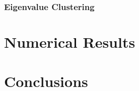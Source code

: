 \documentclass[10pt]{article}
\begin{document}
\begin{multicols}{2}
\subsubsection{Eigenvalue Clustering}

\section{Numerical Results}

\section{Conclusions}



\end{multicols}
\end{document}
